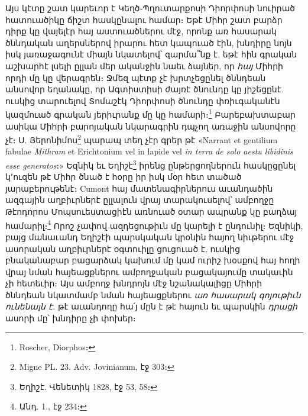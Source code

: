 \documentclass{article}
\begin{document}
{Այս կէտը շատ կարեւոր է Կեղծ֊Պղուտարքոսի Դիորփոսի նուիրած հատուածիկը ճիշտ հասկընալու համար։ Եթէ Միհր շատ բարձր դիրք կը վայելէր հայ աստուածներու մէջ, որոնք առ հասարակ ծննդական աղերսներով իրարու հետ կապուած էին, խնդիրը նոյն իսկ յառաջագունէ միայն նկատելով՝ զարմա՞նք է, եթէ հին գրական աշխարհէ լսելի ըլլան մեր ականջին նաեւ ձայներ, որ \emph{հայ} Միհրի որդի մը կը վերագրեն։ Ջմեզ պէտք չէ խրտչեցընել ծննդեան անսովոր եղանակը, որ Ագտիստիսի ժայռէ ծնունդը կը յիշեցընէ. ուսկից տարուելով Տոմաշէկ Դիորփոսի ծնունդը փռիւգականէն կազմուած գրական յերիւրանք մը կը համարի։\footnote{Roscher, Diorphos։} Բարեբախտաբար ասիկա Միհրի բարոյական նկարագրին դպչող առաջին անսովորը չէ։ Ս. Յերոնիմոս\footnote{Migne PL. 23. Adv. Jovinianum, էջ 303։} պարապ տեղ չէր գրեր թէ «Narrant et gentilium fabulae \emph{Mithram} et Erichtonium vel in lapide vel \emph{in terra de solo aestu libidinis esse generatos}։» Եզնիկ եւ Եղիշէ\footnote{Եղիշէ. Վենետիկ 1828, էջ 53, 58։} իրենց ընթերցողներուն հասկըցընել կ՚ուզեն թէ Միհր ծնած է հօրը իր իսկ մօր հետ տածած յարաբերութենէ։ Cumont հայ մատենագիրներուս աւանդածին ազգային աղբիւրներէ ըլլալուն վրայ տարակուսելով՝ ամբողջը Թէոդորոս Մոպսուեստացիէն առնուած օտար ապրանք կը բաղձայ համարիլ։\footnote{Անդ. 1., էջ 234։} Որոշ չափով ազդեցութիւն մը կարելի է ընդունիլ։ Եզնիկի, բայց մանաւանդ Եղիշէի պարսկական կրօնին հայող նիւթերու մէջ ասորական աղբիւրներէ օգտուիլը ցուցուած է, ուսկից բնականաբար բացարձակ կախում մը կամ ուրիշ խօսքով հայ հողի վրայ նման հայեացքներու ամբողջական բացակայումը տակաւին չի հետեւիր։ Այս ամբողջ խնդրոյն մէջ նշանակալիցը Միհրի ծննդեան նկատմամբ նման հայեացքներու \emph{առ հասարակ գոյութիւն ունենալն է.} թէ աւանդողը հա՛յ մըն է թէ հայուն եւ պարսկին \emph{դրացի} ասորի մը՝ խնդիրը չի փոխեր։

}
\end{document}

